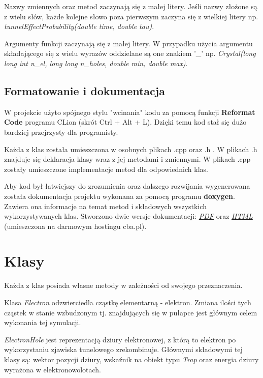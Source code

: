 Nazwy zmiennych oraz metod zaczynają się z małej litery. Jeśli nazwy złożone są z wielu słów, każde kolejne słowo poza pierwszym zaczyna się z wielkiej litery np. \textit{tunnelEffectProbability(double time, double tau)}. 

Argumenty funkcji zaczynają się z małej litery. W przypadku użycia argumentu składającego się z wielu wyrazów oddzielane są one znakiem '\_'  np. \textit{Crystal(long long int n\_el, long long n\_holes, double min, double max)}.

\subsection{Formatowanie i dokumentacja}

W projekcie użyto spójnego stylu "wcinania" kodu za pomocą funkcji \textbf{Reformat Code} programu CLion (skrót Ctrl + Alt + L). Dzięki temu kod stał się dużo bardziej przejrzysty dla programisty.

Każda z klas została umieszczona w osobnych plikach .cpp oraz .h . W plikach .h znajduje się deklaracja klasy wraz z jej metodami i zmiennymi. W plikach .cpp zostały umieszczone implementacje metod dla odpowiednich klas. 

Aby kod był łatwiejszy do zrozumienia oraz dalszego rozwijania wygenerowana została dokumentacja projektu wykonana za pomocą programu \textbf{doxygen}. Zawiera ona informacje na temat metod i składowych wszystkich wykorzystywanych klas. Stworzono dwie wersje dokumentacji: \href{https://github.com/Sharkuu/Dissertation/blob/master/Dokumentacja\%20pdf/Dokumentacja.pdf}{\emph{PDF}} oraz \href{http://dokumentacja.c0.pl/}{\emph{HTML}} (umieszczona na darmowym hostingu cba.pl).

\section{Klasy}
Każda z klas posiada własne metody w zależności od swojego przeznaczenia.

Klasa \textit{Electron} odzwierciedla cząstkę elementarną - elektron. Zmiana ilości tych cząstek w stanie wzbudzonym tj. znajdujących się w pułapce jest głównym celem wykonania tej symulacji.

\textit{ElectronHole} jest reprezentacją dziury elektronowej, z którą to elektron po wykorzystaniu zjawiska tunelowego zrekombinuje. Głównymi składowymi tej klasy są: wektor pozycji dziury, wskaźnik na obiekt typu \textit{Trap} oraz energia dziury wyrażona w elektronowolotach. 

